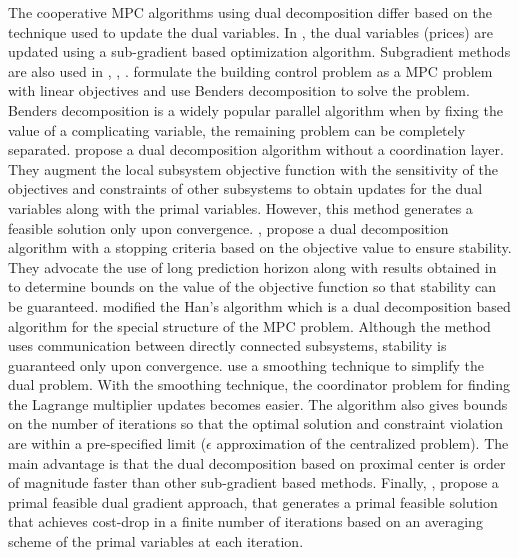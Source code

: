 \documentclass[10pt]{article}
\theoremstyle{definition}
\begin{document}
The cooperative MPC algorithms using dual decomposition differ based on
the technique used to update the dual variables. In
\citet{cheng:forbes:yip:2007}, the dual variables (prices) are updated
using a sub-gradient based optimization algorithm. Subgradient methods
are also used in \citet{ma:anderson:borrelli:2011},
\citet{wakasa:arakawa:tanka:akashi:2008},
\citet{marcos:forbes:guay:2009}. \citet{morocan:bourdais:dumur:buisson:2011}
formulate the building control problem as a MPC problem with linear
objectives and use Benders decomposition to solve the problem. Benders
decomposition is a widely popular parallel algorithm when by fixing the
value of a complicating variable, the remaining problem can be
completely separated. \citet{scheu:marquardt:2011} propose a dual
decomposition algorithm without a coordination layer. They augment the
local subsystem objective function with the sensitivity of the
objectives and constraints of other subsystems to obtain updates for
the dual variables along with the primal variables. However, this
method generates a feasible solution only upon
convergence. \citet{giselsson:doan:keviczky:schutter:rantzer:2012}, \citet{giselsson:rantzer:2010}
propose a dual decomposition algorithm with a stopping criteria based
on the objective value to ensure stability. They advocate the use of
long prediction horizon along with results obtained in
\citet{grune:2009} to determine bounds on the value of the objective
function so that stability can be
guaranteed. \citet{doan:keviczky:necoara:diehl:schutter:2009} modified
the Han's algorithm which is a dual decomposition based algorithm for
the special structure of the MPC problem. Although the method uses
communication between directly connected subsystems, stability is
guaranteed only upon convergence. \citet{necoara:doan:suykens:2008}
use a smoothing technique to simplify the dual problem. With the
smoothing technique, the coordinator problem for finding the Lagrange
multiplier updates becomes easier. The algorithm also gives bounds on
the number of iterations so that the optimal solution and constraint
violation are within a pre-specified limit ($\epsilon$ approximation of
the centralized problem). The main advantage is that the dual
decomposition based on proximal center is order of magnitude faster
than other sub-gradient based methods. Finally,
\citet{doan:keviczky:schutter:2011}, propose a primal feasible dual
gradient approach, that generates a primal feasible solution  that
achieves cost-drop in a
finite number of iterations based on an averaging scheme of the primal
variables at each iteration. 
\end{document}
